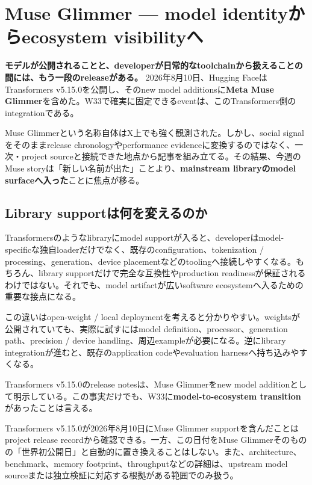 \section{Muse Glimmer --- model identityからecosystem visibilityへ}
\label{sec:muse-glimmer}

\textbf{モデルが公開されることと、developerが日常的なtoolchainから扱えることの間には、もう一段のreleaseがある。}
2026年8月10日、Hugging FaceはTransformers v5.15.0を公開し、そのnew model additionsに\textbf{Meta Muse Glimmer}を含めた\cite{hf-transformers-515}。W33で確実に固定できるeventは、このTransformers側のintegrationである。

Muse Glimmerという名称自体はX上でも強く観測された\cite{w33-grok-r3-observation}。しかし、social signalをそのままrelease chronologyやperformance evidenceに変換するのではなく、一次・project sourceと接続できた地点から記事を組み立てる。その結果、今週のMuse storyは「新しい名前が出た」ことより、\textbf{mainstream libraryのmodel surfaceへ入った}ことに焦点が移る。

\subsection*{Library supportは何を変えるのか}

Transformersのようなlibraryにmodel supportが入ると、developerはmodel-specificな独自loaderだけでなく、既存のconfiguration、tokenization / processing、generation、device placementなどのtoolingへ接続しやすくなる。もちろん、library supportだけで完全な互換性やproduction readinessが保証されるわけではない。それでも、model artifactが広いsoftware ecosystemへ入るための重要な接点になる。

この違いはopen-weight / local deploymentを考えると分かりやすい。weightsが公開されていても、実際に試すにはmodel definition、processor、generation path、precision / device handling、周辺exampleが必要になる。逆にlibrary integrationが進むと、既存のapplication codeやevaluation harnessへ持ち込みやすくなる。

Transformers v5.15.0のrelease notesは、Muse Glimmerをnew model additionとして明示している\cite{hf-transformers-515}。この事実だけでも、W33に\textbf{model-to-ecosystem transition}があったことは言える。

\begin{claimboundary}
Transformers v5.15.0が2026年8月10日にMuse Glimmer supportを含んだことはproject release recordから確認できる\cite{hf-transformers-515}。一方、この日付をMuse Glimmerそのものの「世界初公開日」と自動的に置き換えることはしない。また、architecture、benchmark、memory footprint、throughputなどの詳細は、upstream model sourceまたは独立検証に対応する根拠がある範囲でのみ扱う。
\end{claimboundary}

